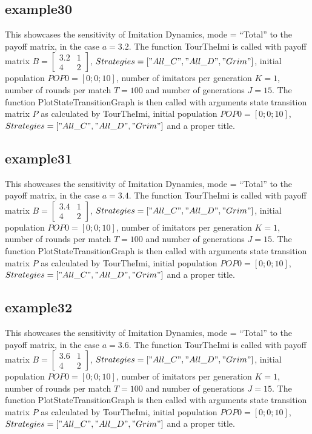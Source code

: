 \subsection{example30}
This showcases the sensitivity of Imitation Dynamics, mode = ``Total'' to the payoff matrix, in the case $a = 3.2$. The function TourTheImi is called with payoff matrix $B = \begin{bmatrix} 3.2 & 1 \\ 4 & 2 \end{bmatrix}$, $Strategies = ["All\_C", "All\_D", "Grim"]$, initial population $POP0 = [0; 0; 10]$, number of imitators per generation $K=1$, number of rounds per match $T = 100$ and number of generations $J = 15$. The function PlotStateTransitionGraph is then called with arguments state transition matrix $P$ as calculated by TourTheImi, initial population $POP0 = [0; 0; 10]$, $Strategies = ["All\_C", "All\_D", "Grim"]$ and a proper title.

\subsection{example31}
This showcases the sensitivity of Imitation Dynamics, mode = ``Total'' to the payoff matrix, in the case $a = 3.4$. The function TourTheImi is called with payoff matrix $B = \begin{bmatrix} 3.4 & 1 \\ 4 & 2 \end{bmatrix}$, $Strategies = ["All\_C", "All\_D", "Grim"]$, initial population $POP0 = [0; 0; 10]$, number of imitators per generation $K=1$, number of rounds per match $T = 100$ and number of generations $J = 15$. The function PlotStateTransitionGraph is then called with arguments state transition matrix $P$ as calculated by TourTheImi, initial population $POP0 = [0; 0; 10]$, $Strategies = ["All\_C", "All\_D", "Grim"]$ and a proper title.

\subsection{example32}
This showcases the sensitivity of Imitation Dynamics, mode = ``Total'' to the payoff matrix, in the case $a = 3.6$. The function TourTheImi is called with payoff matrix $B = \begin{bmatrix} 3.6 & 1 \\ 4 & 2 \end{bmatrix}$, $Strategies = ["All\_C", "All\_D", "Grim"]$, initial population $POP0 = [0; 0; 10]$, number of imitators per generation $K=1$, number of rounds per match $T = 100$ and number of generations $J = 15$. The function PlotStateTransitionGraph is then called with arguments state transition matrix $P$ as calculated by TourTheImi, initial population $POP0 = [0; 0; 10]$, $Strategies = ["All\_C", "All\_D", "Grim"]$ and a proper title.


